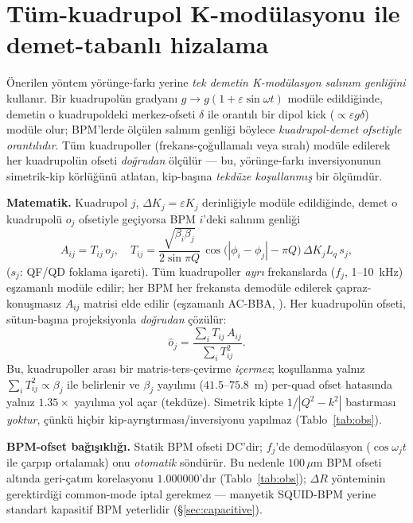 \documentclass[twocolumn,a4paper,10pt]{article}
\begin{document}
\section{Tüm-kuadrupol K-modülasyonu ile demet-tabanlı hizalama}
\label{sec:method}
Önerilen yöntem yörünge-farkı yerine \emph{tek demetin K-modülasyon salınım
genliğini} kullanır. Bir kuadrupolün gradyanı $g \to g(1+\varepsilon\sin\omega t)$
modüle edildiğinde, demetin o kuadrupoldeki merkez-ofseti $\delta$ ile orantılı
bir dipol kick ($\propto \varepsilon g \delta$) modüle olur; BPM'lerde ölçülen
salınım genliği böylece \emph{kuadrupol-demet ofsetiyle orantılıdır}. Tüm
kuadrupoller (frekans-çoğullamalı veya sıralı) modüle edilerek her kuadrupolün
ofseti \emph{doğrudan} ölçülür --- bu, yörünge-farkı inversiyonunun simetrik-kip
körlüğünü atlatan, kip-başına \emph{tekdüze koşullanmış} bir ölçümdür.

\textbf{Matematik.} Kuadrupol $j$, $\Delta K_j = \varepsilon K_j$ derinliğiyle
modüle edildiğinde, demet o kuadrupolü $o_j$ ofsetiyle geçiyorsa BPM $i$'deki
salınım genliği
\begin{equation}
A_{ij} = T_{ij}\,o_j, \quad
T_{ij} = \frac{\sqrt{\beta_i \beta_j}}{2\sin\pi Q}\,
\cos\!\big(|\phi_i-\phi_j|-\pi Q\big)\,\Delta K_j L_q\,s_j,
\label{eq:Tmatrix}
\end{equation}
($s_j$: QF/QD foklama işareti). Tüm kuadrupoller \emph{ayrı} frekanslarda
($f_j$, 1--10~kHz) eşzamanlı modüle edilir; her BPM her frekansta demodüle
edilerek çapraz-konuşmasız $A_{ij}$ matrisi elde edilir (eşzamanlı AC-BBA,
\cite{huang2022}). Her kuadrupolün ofseti, sütun-başına projeksiyonla
\emph{doğrudan} çözülür:
\begin{equation}
\hat o_j = \frac{\sum_i T_{ij}\,A_{ij}}{\sum_i T_{ij}^2}.
\label{eq:proj}
\end{equation}
Bu, kuadrupoller arası bir matris-ters-çevirme \emph{içermez}; koşullanma yalnız
$\sum_i T_{ij}^2 \propto \beta_j$ ile belirlenir ve $\beta_j$ yayılımı
($41.5$--$75.8$~m) per-quad ofset hatasında yalnız $1.35\times$ yayılıma yol açar
(tekdüze). Simetrik kipte $1/|Q^2-k^2|$ bastırması \emph{yoktur}, çünkü hiçbir
kip-ayrıştırması/inversiyonu yapılmaz (Tablo~\ref{tab:obs}).

\textbf{BPM-ofset bağışıklığı.} Statik BPM ofseti DC'dir; $f_j$'de demodülasyon
($\cos\omega_j t$ ile çarpıp ortalamak) onu \emph{otomatik} söndürür. Bu nedenle
$100\,\mu$m BPM ofseti altında geri-çatım korelasyonu $1.000000$'dır
(Tablo~\ref{tab:obs}); $\Delta R$ yönteminin gerektirdiği common-mode iptal
gerekmez --- manyetik SQUID-BPM yerine standart kapasitif BPM yeterlidir
(§\ref{sec:capacitive}).
\end{document}
